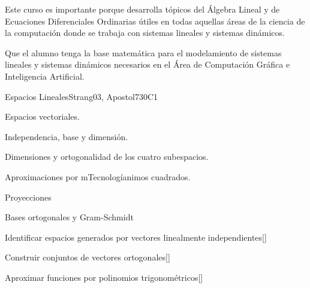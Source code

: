 \begin{syllabus}


\begin{justification}
Este curso es importante porque desarrolla tópicos del Álgebra Lineal y de Ecuaciones Diferenciales Ordinarias útiles en todas aquellas áreas de la ciencia de la computación donde se trabaja con sistemas lineales y sistemas dinámicos.
\end{justification}

\begin{goals}
\item Que el alumno tenga la base matemática para el modelamiento de sistemas lineales y sistemas dinámicos necesarios en el Área de Computación Gráfica e Inteligencia Artificial.
\end{goals}

\begin{outcomes}
  \item {}
  \item {}
  \item {}
\end{outcomes}

\begin{competences}
    \item {} 
    \item {}
    \item {}
\end{competences}

\begin{unit}{}{Espacios Lineales}{Strang03, Apostol73}{0}{C1}
\begin{topics}
      \item Espacios vectoriales.
      \item Independencia, base y dimensión.
      \item Dimensiones y ortogonalidad de los cuatro subespacios.
      \item Aproximaciones por mTecnologíanimos cuadrados.
      \item Proyecciones
      \item Bases ortogonales y Gram-Schmidt
   \end{topics}
   \begin{learningoutcomes}
      \item Identificar espacios generados por vectores linealmente independientes[\Usage]
      \item Construir conjuntos de vectores ortogonales[\Usage]
      \item Aproximar funciones por polinomios trigonométricos[\Usage]
   \end{learningoutcomes}
\end{unit}


\end{syllabus}
